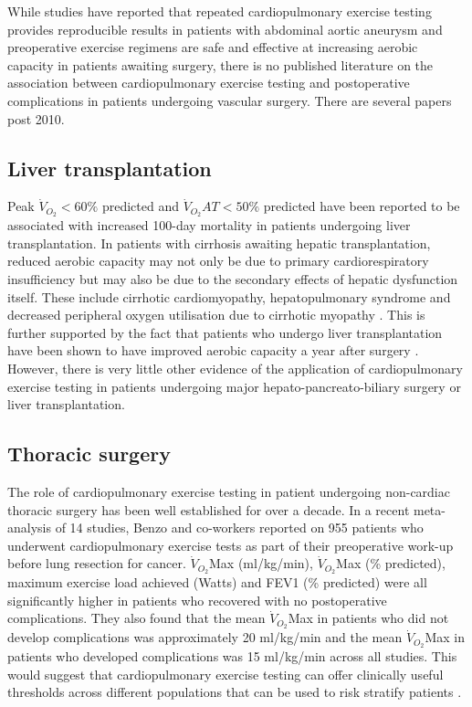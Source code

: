While studies have reported that repeated cardiopulmonary exercise testing provides reproducible results in patients with abdominal aortic aneurysm and preoperative exercise regimens are safe and effective at increasing aerobic capacity in patients awaiting surgery, there is no published literature on the association between cardiopulmonary exercise testing and postoperative complications in patients undergoing vascular surgery. %
There are several papers post 2010. 

\subsection{Liver transplantation}
Peak $\dot{V}_{O_2}<60\%$ predicted and $\dot{V}_{O_2}AT<50\%$ predicted have been reported to be associated with increased 100-day mortality in patients undergoing liver transplantation. 
In patients with cirrhosis awaiting hepatic transplantation, reduced aerobic capacity may not only be due to primary cardiorespiratory insufficiency but may also be due to the secondary effects of hepatic dysfunction itself. 
These include cirrhotic cardiomyopathy, hepatopulmonary syndrome and decreased peripheral oxygen utilisation due to cirrhotic myopathy \parencite{epstein_aerobic_2004}. 
This is further supported by the fact that patients who undergo liver transplantation have been shown to have improved aerobic capacity a year after surgery \parencite{iscar_functional_2009}. 
However, there is very little other evidence of the application of cardiopulmonary exercise testing in patients undergoing major hepato-pancreato-biliary surgery or liver transplantation.

\subsection{Thoracic surgery}
The role of cardiopulmonary exercise testing in patient undergoing non-cardiac thoracic surgery has been well established for over a decade. 
In a recent meta-analysis of 14 studies, Benzo and co-workers reported on 955 patients who underwent cardiopulmonary exercise tests as part of their preoperative work-up before lung resection for cancer. $\dot{V}_{O_2}$Max (ml/kg/min), $\dot{V}_{O_2}$Max (\% predicted), maximum exercise load achieved (Watts) and FEV1 (\% predicted) were all significantly higher in patients who recovered with no postoperative complications. 
They also found that the mean $\dot{V}_{O_2}$Max in patients who did not develop complications was approximately 20 ml/kg/min and the mean $\dot{V}_{O_2}$Max in patients who developed complications was 15 ml/kg/min across all studies. 
This would suggest that cardiopulmonary exercise testing can offer clinically useful thresholds across different populations that can be used to risk stratify patients \parencite{benzo_complications_2007}. 

